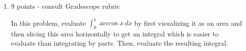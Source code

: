 \documentclass{article}
\begin{document}
\begin{enumerate}

\item

\begin{grading}
    9 points - consult Gradescope rubric
\end{grading}
  \begin{problem}[\vfill\newpage]
    In this problem, evaluate $\displaystyle
    \int_0^{1} \arccos x\,dx$ by first
    visualizing it as an area and then slicing this area horizontally to get an
     integral which is easier to evaluate than integrating by parts. Then, evaluate the resulting integral.
  \end{problem}


\end{enumerate}
\end{document}
